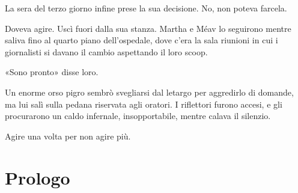 \documentclass[a4paper,11pt,oneside,openright,final]{memoir}
\begin{document}
La sera del terzo giorno infine prese la sua decisione. No, non poteva farcela.

Doveva agire. Uscì fuori dalla sua stanza. Martha e Méav lo seguirono mentre
saliva fino al quarto piano dell’ospedale, dove c’era la sala riunioni in
cui i giornalisti si davano il cambio aspettando il loro scoop.

«Sono pronto» disse loro.

Un enorme orso pigro sembrò svegliarsi dal letargo per aggredirlo di domande,
ma lui salì sulla pedana riservata agli oratori. I riflettori furono accesi, e
gli procurarono un caldo infernale, insopportabile, mentre calava il silenzio.

Agire una volta per non agire più.

\backmatter

\chapter{Prologo}
\end{document}
